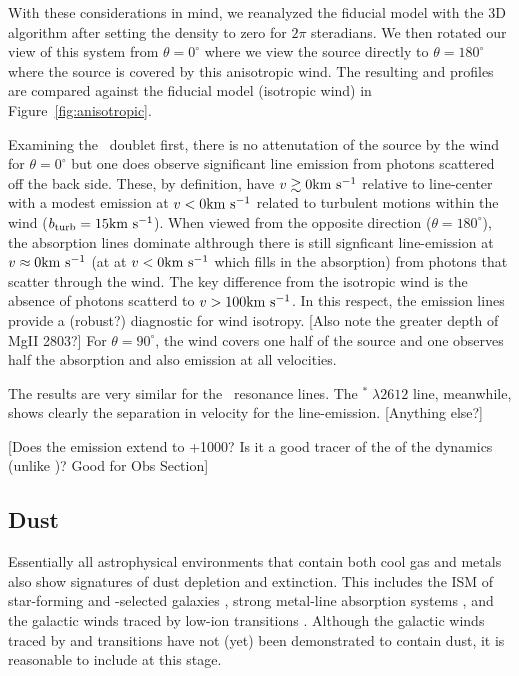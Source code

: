 \documentclass[12pt,preprint]{aastex}
\begin{document}
With these considerations in mind, we reanalyzed the fiducial model
with the 3D algorithm after setting the density to zero for $2\pi$ steradians.
We then rotated our view of this system from $\theta = 0^\circ$ where
we view the source directly to $\theta = 180^\circ$ where the source
is covered by this anisotropic wind.  The resulting  and
 profiles are compared against the fiducial model
(isotropic wind) in Figure~\ref{fig:anisotropic}.  

Examining the \mgiid\ doublet first, 
there is no attenutation of the source by the wind for $\theta =
0^\circ$
but one does observe significant line emission from photons scattered
off the back side.  These, by definition, have $v \gtrsim 0 {\rm km~s^{-1}}$
relative to line-center with a modest emission at $v<0 {\rm km~s^{-1}}$ related
to turbulent motions within the wind ($b_{\rm turb} = 15 {\rm km~s^{-1}}$).
When viewed from the opposite direction ($\theta = 180^\circ$), the
absorption lines dominate althrough there is still signficant
line-emission at $v \approx 0 {\rm km~s^{-1}}$ (at at $v < 0 {\rm km~s^{-1}}$ which fills
in the absorption) from photons that scatter through the wind.  The
key difference from the isotropic wind is the absence of photons
scatterd to $v > 100 {\rm km~s^{-1}}$.  In this respect, the emission lines
provide a (robust?) diagnostic for wind isotropy.  [Also note the
greater depth of MgII 2803?]
For $\theta = 90^\circ$, the wind covers one half of the source and
one observes half the absorption and also emission at all velocities.

The results are very similar for the \feiid\ resonance lines.  The
$^* \; \lambda 2612$ line, meanwhile, shows clearly the
separation in velocity for the line-emission.   [Anything else?]


[Does the emission extend to +1000\kms?  Is it a good tracer of the of
the dynamics (unlike \lya)? Good for Obs Section]

\subsection{Dust}
\label{sec:dust}

Essentially all astrophysical environments that contain both cool gas
and metals also show signatures of dust depletion and extinction.  This includes the
ISM of star-forming and -selected galaxies
\citep[e.g.][]{ss96,pw01,pcd+07}, strong  metal-line
absorption systems \citep{york,menard}, and the galactic winds traced
by low-ion transitions \citep{cb58,naI}.  Although the galactic winds
traced by  and  transitions have not (yet) been
demonstrated to contain dust, it is reasonable to include at this
stage.  
\end{document}
